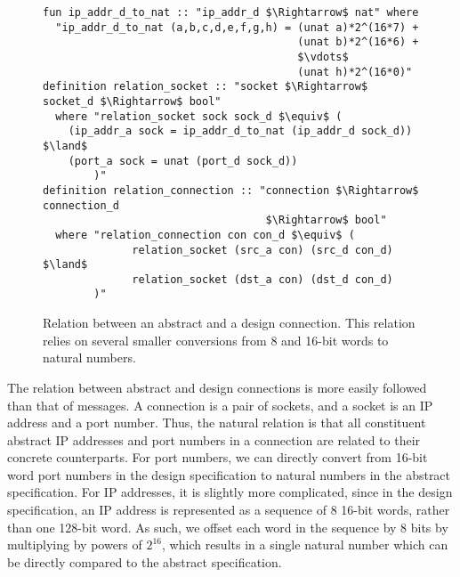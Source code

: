 \documentclass[twoside]{memoir}
\begin{document}
\begin{figure}[h]
    \centering
    \begin{lstlisting}[language=isabelle]
fun ip_addr_d_to_nat :: "ip_addr_d $\Rightarrow$ nat" where
  "ip_addr_d_to_nat (a,b,c,d,e,f,g,h) = (unat a)*2^(16*7) +
                                        (unat b)*2^(16*6) +
                                        $\vdots$
                                        (unat h)*2^(16*0)"
definition relation_socket :: "socket $\Rightarrow$ socket_d $\Rightarrow$ bool"
  where "relation_socket sock sock_d $\equiv$ (
    (ip_addr_a sock = ip_addr_d_to_nat (ip_addr_d sock_d)) $\land$
    (port_a sock = unat (port_d sock_d))
        )"
definition relation_connection :: "connection $\Rightarrow$ connection_d
                                   $\Rightarrow$ bool"
  where "relation_connection con con_d $\equiv$ (
              relation_socket (src_a con) (src_d con_d) $\land$
              relation_socket (dst_a con) (dst_d con_d)
        )"
    \end{lstlisting}
    \caption{Relation between an abstract and a design connection.
    This relation relies on several smaller conversions from 8 and 16-bit words to natural numbers.
    }
    \label{fig:rel-conn}
\end{figure}

The relation between abstract and design connections is more easily followed than that of messages.
A connection is a pair of sockets, and a socket is an IP address and a port number.
Thus, the natural relation is that all constituent abstract IP addresses and port numbers in a connection
are related to their concrete counterparts.
For port numbers, we can directly convert from 16-bit word port numbers in the design specification
to natural numbers in the abstract specification.
For IP addresses, it is slightly more complicated, since in the design specification,
an IP address is represented as a sequence of 8 16-bit words, rather than one 128-bit word.
As such, we offset each word in the sequence by 8 bits by multiplying by powers of $2^{16}$,
which results in a single natural number which can be directly compared to the abstract specification.
\end{document}
